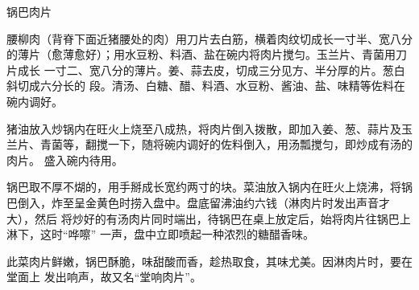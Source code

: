 \begin{recipe}{锅巴肉片}

\ingredients


\preparation

\step 腰柳肉（背脊下面近猪腰处的肉）用刀片去白筋，横着肉纹切成长一寸半、宽八分
的薄片（愈薄愈好）；用水豆粉、料酒、盐在碗内将肉片搅匀。玉兰片、青菌用刀片成长
一寸二、宽八分的薄片。姜、蒜去皮，切成三分见方、半分厚的片。葱白斜切成六分长的
段。清汤、白糖、醋、料酒、水豆粉、酱油、盐、味精等佐料在碗内调好。

\step 猪油放入炒锅内在旺火上烧至八成热，将肉片倒入拨散，即加入姜、葱、蒜片及玉
兰片、青菌等，翻搅一下，随将碗内调好的佐料倒入，用汤瓢搅匀，即炒成有汤的肉片。
盛入碗内待用。

\step 锅巴取不厚不煳的，用手掰成长宽约两寸的块。菜油放入锅内在旺火上烧沸，将锅
巴倒入，炸至呈金黄色时捞入盘中。盘底留沸油约六钱（淋肉片时发出声音才大），然后
将炒好的有汤肉片同时端出，待锅巴在桌上放定后，始将肉片往锅巴上淋下，这时“哗嚓”
一声，盘中立即喷起一种浓烈的糖醋香味。

\features

此菜肉片鲜嫩，锅巴酥脆，味甜酸而香，趁热取食，其味尤美。因淋肉片时，要在堂面上
发出响声，故又名“堂响肉片”。

\end{recipe}

